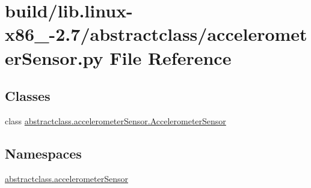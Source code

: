 \hypertarget{build_2lib_8linux-x86__64-2_87_2abstractclass_2accelerometerSensor_8py}{}\section{build/lib.linux-\/x86\+\_-\/2.7/abstractclass/accelerometer\+Sensor.py File Reference}
\label{build_2lib_8linux-x86__64-2_87_2abstractclass_2accelerometerSensor_8py}
\subsection*{Classes}
\begin{DoxyCompactItemize}
\item 
class \hyperlink{classabstractclass_1_1accelerometerSensor_1_1AccelerometerSensor}{abstractclass.\+accelerometer\+Sensor.\+Accelerometer\+Sensor}
\end{DoxyCompactItemize}
\subsection*{Namespaces}
\begin{DoxyCompactItemize}
\item 
 \hyperlink{namespaceabstractclass_1_1accelerometerSensor}{abstractclass.\+accelerometer\+Sensor}
\end{DoxyCompactItemize}
